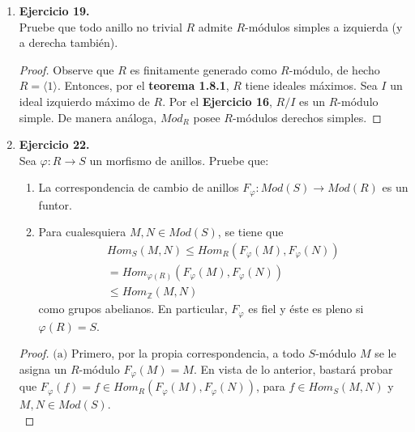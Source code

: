 \documentclass{article}
\newcommand{\lrprth}[1]{
    \left(#1\right)
}
\newcommand{\descset}[3]{
    \left\{#1\in#2\ \vline\ #3\right\}
}
\newcommand{\ringmodhom}[3]{
	Hom_{#1}\lrprth{#2,#3}
}
\theoremstyle{definition}
\theoremstyle{plain}
\theoremstyle{plain}
\theoremstyle{definition}
\theoremstyle{definition}
\theoremstyle{definition}
\theoremstyle{definition}
\theoremstyle{definition}
\theoremstyle{definition}
\begin{document}
\begin{enumerate}[label=\textbf{Ej \arabic*.}]
\begin{proof}
		Por último, observe que
		\begin{align*}
			\widehat{\pi}_{N} \lrprth{ \widehat{\pi}_{N}^{-1} \lrprth{T}}=\descset{x+N}{M/N}{x \in \widehat{\pi}_{N}^{-1} \lrprth{T}}\\
			=\descset{x+N}{M/N}{x \in T}\\
			=T
		\end{align*}
		Más aún, para cualesquiera $T_{1},T_{2} \in L\lrprth{M/N}$, se identifican
		\begin{align*}
			\widehat{\pi}_{N}^{-1} \lrprth{T_{1} \cap T_{2}} = \widehat{\pi}_{N}^{-1} \lrprth{T_{1}} \cap \widehat{\pi}_{N}^{-1} \lrprth{T_{2}}\\
			\intertext{y}
			\widehat{\pi}_{N}^{-1} \lrprth{T_{1}+T_{2}} = \widehat{\pi}_{N}^{-1} \lrprth{T_{1}} + \widehat{\pi}_{N}^{-1} \lrprth{T_{2}}
		\end{align*}
		$\therefore\widehat{\pi}_{N}$ es un isomorfismo de retículas.
	\end{proof}

	\item\textbf{Ejercicio 19.}\\
	Pruebe que todo anillo no trivial $R$ admite $R$-módulos simples a izquierda (y a derecha también).
	\begin{proof}
	Observe que $R$ es finitamente generado como $R$-módulo, de hecho $R= \langle 1 \rangle$. Entonces, por el \textbf{teorema 1.8.1}, $R$ tiene ideales máximos. Sea $I$ un ideal izquierdo máximo de $R$. Por el \textbf{Ejercicio 16}, $R/I$ es un $R$-módulo simple. De manera análoga, $Mod_{R}$ posee $R$-módulos derechos simples.
	\end{proof}

	\item \textbf{Ejercicio 22.}\\
	Sea $\varphi : R \longrightarrow S$ un morfismo de anillos. Pruebe que:
	\begin{enumerate}
		\item La correspondencia de cambio de anillos $F_{\varphi} : Mod\lrprth{S} \longrightarrow Mod\lrprth{R}$ es un funtor.
		\item Para cualesquiera $M,N \in Mod\lrprth{S}$, se tiene que
		\begin{align*}
			\ringmodhom{S}{M}{N} \leq \ringmodhom{R}{F_{\varphi}\lrprth{M}}{F_{\varphi}\lrprth{N}}\\
			= \ringmodhom{\varphi \lrprth{R}}{F_{\varphi}\lrprth{M}}{F_{\varphi}\lrprth{N}}\\
			\leq \ringmodhom{\mathbb{Z}}{M}{N}
		\end{align*}
		como grupos abelianos. En particular, $F_{\varphi}$ es fiel y éste es pleno si $\varphi \lrprth{R}=S$.
	\end{enumerate}
	\begin{proof}
		$\boxed{\text{(a)}}$ Primero, por la propia correspondencia, a todo $S$-módulo $M$ se le asigna un $R$-módulo $F_{\varphi} \lrprth{M}=M$. En vista de lo anterior, bastará probar que $F_{\varphi}\lrprth{f} = f \in \ringmodhom{R}{F_{\varphi}\lrprth{M}}{F_{\varphi}\lrprth{N}}$, para $f \in \ringmodhom{S}{M}{N}$ y $M,N \in Mod\lrprth{S}$.\\
	

\end{proof}
\end{enumerate}
\end{document}
